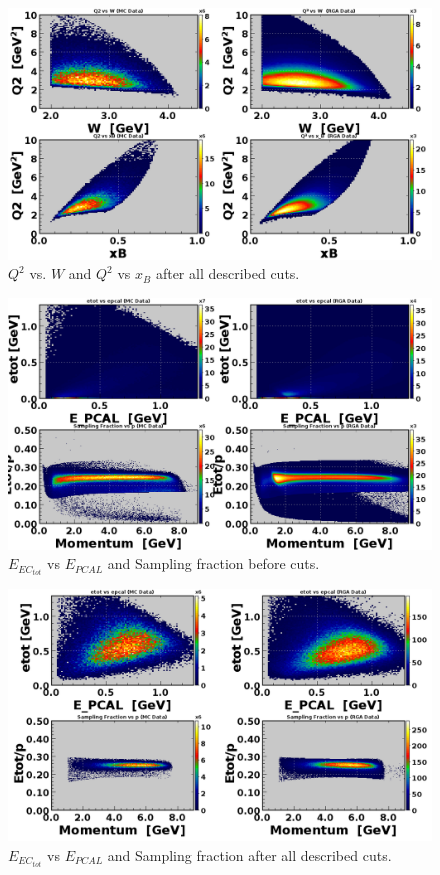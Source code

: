 \begin{figure}[h!]
	\centering
	\includegraphics[width=0.9\linewidth]{figures/rga/2Dkin2.png}
	\caption{$Q^2$ vs. $W$ and $Q^2$ vs $x_B$ after all described cuts.}
	\label{fig:rga_2Dkin2}
\end{figure}

\newpage
\begin{figure}[h!]
	\centering
	\includegraphics[width=0.9\linewidth]{figures/rga/uncut/sampFrac.png}
	\caption{$E_{EC_{tot}}$ vs $E_{PCAL}$ and Sampling fraction before cuts.}
	\label{fig:rga_sampFrac_uncut}
\end{figure}

\begin{figure}[h!]
	\centering
	\includegraphics[width=0.9\linewidth]{figures/rga/sampFrac.png}
	\caption{$E_{EC_{tot}}$ vs $E_{PCAL}$ and Sampling fraction after all described cuts.}
	\label{fig:rga_sampFrac}
\end{figure}

